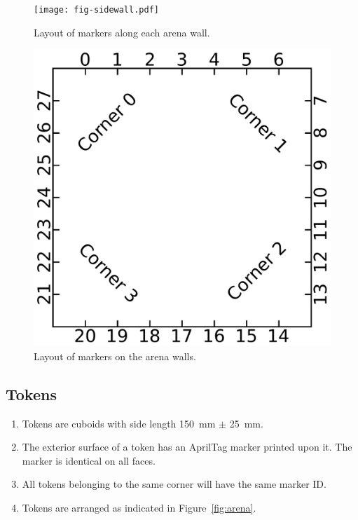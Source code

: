 \begin{figure}
  \centering
  \texttt{[image: fig-sidewall.pdf]}
  \caption{Layout of markers along each arena wall.}
  \label{fig:sidewall}
\end{figure}


\begin{figure}
  \centering
  \includegraphics[scale=0.5]{fig-markers.pdf}
  \caption{Layout of markers on the arena walls.}
  \label{fig:markers}
\end{figure}

\subsection{Tokens}
\label{spec:tokens}

\begin{enumerate}
  \item Tokens are cuboids with side length \SI{150}{mm} $\pm$ \SI{25}{mm}.
  \item The exterior surface of a token has an AprilTag marker printed upon it. The marker is identical on all faces.
  \item All tokens belonging to the same corner will have the same marker ID.
  \item Tokens are arranged as indicated in Figure~\ref{fig:arena}.
\end{enumerate}

